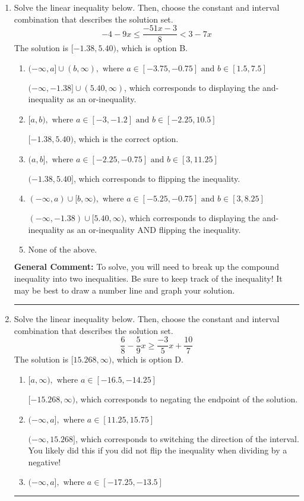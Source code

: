 \documentclass{extbook}[14pt]
\newcommand{\litem}[1]{\item #1

\rule{\textwidth}{0.4pt}}
\begin{document}
\begin{enumerate}\litem{
Solve the linear inequality below. Then, choose the constant and interval combination that describes the solution set.
\[ -4 - 9 x \leq \frac{-51 x - 3}{8} < 3 - 7 x \]The solution is \( [-1.38, 5.40) \), which is option B.\begin{enumerate}[label=\Alph*.]
\item \( (-\infty, a] \cup (b, \infty), \text{ where } a \in [-3.75, -0.75] \text{ and } b \in [1.5, 7.5] \)

$(-\infty, -1.38] \cup (5.40, \infty)$, which corresponds to displaying the and-inequality as an or-inequality.
\item \( [a, b), \text{ where } a \in [-3, -1.2] \text{ and } b \in [-2.25, 10.5] \)

$[-1.38, 5.40)$, which is the correct option.
\item \( (a, b], \text{ where } a \in [-2.25, -0.75] \text{ and } b \in [3, 11.25] \)

$(-1.38, 5.40]$, which corresponds to flipping the inequality.
\item \( (-\infty, a) \cup [b, \infty), \text{ where } a \in [-5.25, -0.75] \text{ and } b \in [3, 8.25] \)

$(-\infty, -1.38) \cup [5.40, \infty)$, which corresponds to displaying the and-inequality as an or-inequality AND flipping the inequality.
\item \( \text{None of the above.} \)


\end{enumerate}

\textbf{General Comment:} To solve, you will need to break up the compound inequality into two inequalities. Be sure to keep track of the inequality! It may be best to draw a number line and graph your solution.
}
\litem{
Solve the linear inequality below. Then, choose the constant and interval combination that describes the solution set.
\[ \frac{6}{8} - \frac{5}{9} x \geq \frac{-3}{5} x + \frac{10}{7} \]The solution is \( [15.268, \infty) \), which is option D.\begin{enumerate}[label=\Alph*.]
\item \( [a, \infty), \text{ where } a \in [-16.5, -14.25] \)

 $[-15.268, \infty)$, which corresponds to negating the endpoint of the solution.
\item \( (-\infty, a], \text{ where } a \in [11.25, 15.75] \)

 $(-\infty, 15.268]$, which corresponds to switching the direction of the interval. You likely did this if you did not flip the inequality when dividing by a negative!
\item \( (-\infty, a], \text{ where } a \in [-17.25, -13.5] \)


\end{enumerate}}
\end{enumerate}
\end{document}
